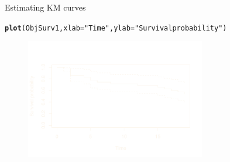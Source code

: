 \documentclass[12pt,english,pdf,xcolor=dvipsnames,aspectratio=169]{beamer}\usepackage[]{graphicx}\usepackage[]{xcolor}
\makeatletter
\newcommand{\hlstr}[1]{\textcolor[rgb]{0.192,0.494,0.8}{#1}}%
\newcommand{\hlstd}[1]{\textcolor[rgb]{0.345,0.345,0.345}{#1}}%
\newcommand{\hlkwc}[1]{\textcolor[rgb]{0.333,0.667,0.333}{#1}}%
\newcommand{\hlkwd}[1]{\textcolor[rgb]{0.737,0.353,0.396}{\textbf{#1}}}%
\newenvironment{kframe}{%
 \def\at@end@of@kframe{}%
 \ifinner\ifhmode%
  \def\at@end@of@kframe{\end{minipage}}%
  \begin{minipage}{\columnwidth}%
 \fi\fi%
 \def\FrameCommand##1{\hskip\@totalleftmargin \hskip-\fboxsep
 \colorbox{shadecolor}{##1}\hskip-\fboxsep
     \hskip-\linewidth \hskip-\@totalleftmargin \hskip\columnwidth}%
 \MakeFramed {\advance\hsize-\width
   \@totalleftmargin\z@ \linewidth\hsize
   \@setminipage}}%
 {\par\unskip\endMakeFramed%
 \at@end@of@kframe}
\newenvironment{knitrout}{}{} %
\makeatother
\begin{document}
\begin{frame}[fragile]{Estimating KM curves}



\begin{knitrout}\scriptsize
{}\color{fgcolor}\begin{kframe}
\begin{alltt}
\hlkwd{plot}\hlstd{(ObjSurv1,} \hlkwc{xlab} \hlstd{=} \hlstr{"Time"}\hlstd{,} \hlkwc{ylab} \hlstd{=} \hlstr{"Survival probability"}\hlstd{)}
\end{alltt}
\end{kframe}
\end{knitrout}

\begin{figure}[ht]
  \centering
  \includegraphics[width=0.7\textwidth]{../03-graphs/01-02.pdf}
\end{figure}
\end{frame}
\end{document}
